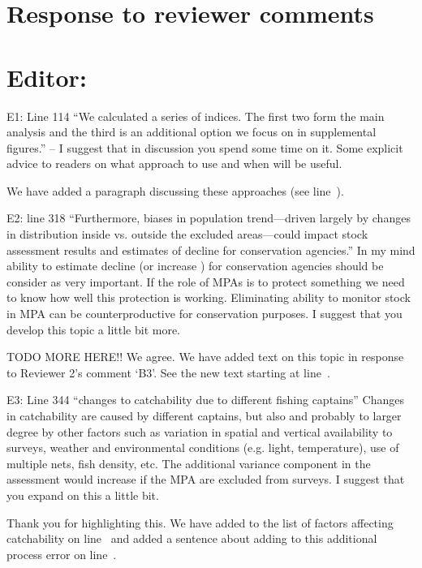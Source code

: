 \documentclass[12pt]{article}
\newcommand{\rev}[1]{{\color{niceblue} #1}}
\newcommand{\lr}[1]{line~\lineref{#1}}
\begin{document}
\clearpage

\section*{Response to reviewer comments}

\setcounter{page}{1}
\nolinenumbers

\setlength{\parskip}{5pt}%
\setlength{\parindent}{0pt}%

\section{Editor:}

\rev{E1: Line 114 “We calculated a series of indices. The first two form the main analysis and the third is an additional option we focus on in supplemental figures.” – I suggest that in discussion you spend some time on it. Some explicit advice to readers on what approach to use and when will be useful.}

We have added a paragraph discussing these approaches (see \lr{E1}).

\rev{E2: line 318 “Furthermore, biases in population trend—driven largely by changes in distribution inside vs. outside the excluded areas—could impact stock assessment results and estimates of decline for conservation agencies.” In my mind ability to estimate decline (or increase ) for conservation agencies should be consider as very important. If the role of MPAs is to protect something we need to know how well this protection is working. Eliminating ability to monitor stock in MPA can be counterproductive for conservation purposes. I suggest that you develop this topic a little bit more.}

TODO MORE HERE!! We agree. We have added text on this topic in response to Reviewer 2's comment `B3'. See the new text starting at \lr{B3}.

\rev{E3: Line 344 “changes to catchability due to different fishing captains” Changes in catchability are caused by different captains, but also and probably to larger degree by other factors such as variation in spatial and vertical availability to surveys, weather and environmental conditions (e.g. light, temperature), use of multiple nets, fish density, etc. The additional variance component in the assessment would increase if the MPA are excluded from surveys. I suggest that you expand on this a little bit.}

Thank you for highlighting this. We have added to the list of factors affecting catchability on \lr{E3a} and added a sentence about adding to this additional process error on \lr{E3b}.
\end{document}
